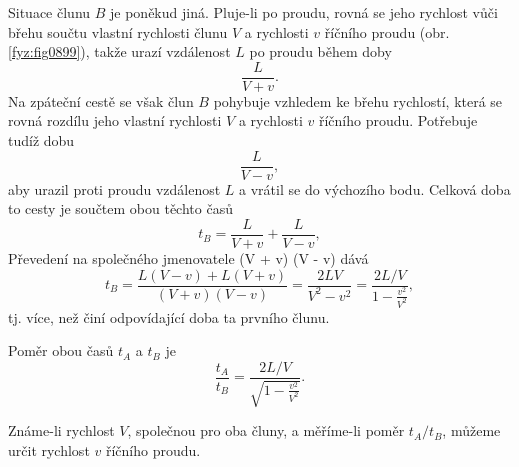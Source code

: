 \begin{mdframed}[style=mdexam]
\begin{example}
    Situace člunu \(B\) je poněkud jiná. Pluje-li po proudu, rovná se jeho rychlost vůči břehu
    součtu vlastní rychlosti člunu \(V\) a rychlosti \(v\) říčního proudu (obr. \ref{fyz:fig0899}),
    takže urazí vzdálenost \(L\) po proudu během doby
    \begin{equation*}
      \frac{L}{V+v}.
    \end{equation*}
    Na zpáteční cestě se však člun \(B\) pohybuje vzhledem ke břehu rychlostí, která se rovná
    rozdílu jeho vlastní rychlosti \(V\) a rychlosti \(v\) říčního proudu. Potřebuje tudíž dobu
    \begin{equation*}
      \frac{L}{V-v},
    \end{equation*}
    aby urazil proti proudu vzdálenost \(L\) a vrátil se do výchozího bodu. Celková doba to cesty je
    součtem obou těchto časů
    \begin{equation*}
      t_B = \frac{L}{V+v} + \frac{L}{V-v},
    \end{equation*}
    Převedení na společného jmenovatele (V + v) (V - v) dává 
    \begin{equation*}
      t_B = \frac{L(V-v)+L(V+v)}{(V+v)(V-v)} = \frac{2LV}{V^2 -v^2} 
          = \frac{2L/V}{1 - \frac{v^2}{V^2}},
    \end{equation*}
    tj. více, než činí odpovídající doba ta prvního člunu.

    {\centering
    \captionsetup{type=figure}
    \par}

    Poměr obou časů \(t_A\) a \(t_B\) je
    \begin{equation*}
      \frac{t_A}{t_B} = \frac{2L/V}{\sqrt{1 - \frac{v^2}{V^2}}}.
    \end{equation*}

    Známe-li rychlost \(V\), společnou pro oba čluny, a měříme-li poměr \(t_A/t_B\), můžeme určit
    rychlost \(v\) říčního proudu.
  \end{example}
\end{mdframed}